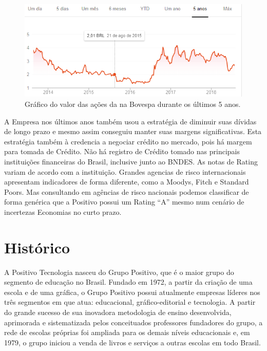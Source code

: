 \begin{figure}[h]
\begin{centering}
\includegraphics[width=1.0\textwidth]{Img/PositivoBovespa}
\caption{Gráfico do valor das ações da \nomeCompletoPositivo{} na Bovespa durante os últimos 5 anos\cite{googleFinancas2018}.}
\par\end{centering}
\end{figure}

A Empresa nos últimos anos também usou a estratégia de diminuir suas dívidas de longo prazo e mesmo assim conseguiu manter suas margens significativas. Esta estratégia também à credencia a negociar crédito no mercado, pois há margem para tomada de Crédito. Não há registro de Crédito tomado nas principais instituições financeiras do Brasil, inclusive junto ao BNDES.
As notas de Rating variam de acordo com a instituição. Grandes agencias de risco internacionais apresentam indicadores de forma diferente, como a Moodys, Fitch e Standard Poors. Mas consultando em agências de risco nacionais podemos classificar de forma genérica que a Positivo possui um Rating “A” mesmo num cenário de incertezas Economias no curto prazo.

\section{Histórico}
A Positivo Tecnologia nasceu do Grupo Positivo, que é o maior grupo do segmento de educação no Brasil\cite{historico2018}. Fundado em 1972, a partir da criação de uma escola e de uma gráfica, o Grupo Positivo possui atualmente empresas líderes nos três segmentos em que atua: educacional, gráfico-editorial e tecnologia. A partir do grande sucesso de sua inovadora metodologia de ensino desenvolvida, aprimorada e sistematizada pelos conceituados professores fundadores do grupo, a rede de escolas próprias foi ampliada para os demais níveis educacionais e, em 1979, o grupo iniciou a venda de livros e serviços a outras escolas em todo Brasil.

